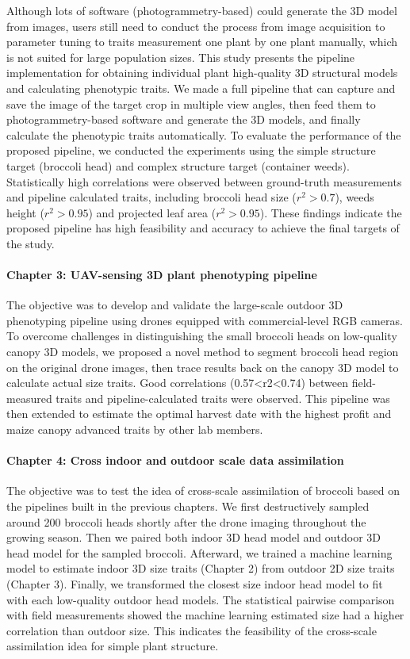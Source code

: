 \begin{eabstract}
  Although lots of software (photogrammetry-based) could generate the 3D model from images, users still need to conduct the process from image acquisition to parameter tuning to traits measurement one plant by one plant manually, which is not suited for large population sizes. This study presents the pipeline implementation for obtaining individual plant high-quality 3D structural models and calculating phenotypic traits. We made a full pipeline that can capture and save the image of the target crop in multiple view angles, then feed them to photogrammetry-based software and generate the 3D models, and finally calculate the phenotypic traits automatically. To evaluate the performance of the proposed pipeline, we conducted the experiments using the simple structure target (broccoli head) and complex structure target (container weeds). Statistically high correlations were observed between ground-truth measurements and pipeline calculated traits, including broccoli head size ($r^2>0.7$), weeds height ($r^2>0.95$) and projected leaf area ($r^2>0.95$). These findings indicate the proposed pipeline has high feasibility and accuracy to achieve the final targets of the study.

 \paragraph{Chapter 3: UAV-sensing 3D plant phenotyping pipeline}

  The objective was to develop and validate the large-scale outdoor 3D phenotyping pipeline using drones equipped with commercial-level RGB cameras. To overcome challenges in distinguishing the small broccoli heads on low-quality canopy 3D models, we proposed a novel method to segment broccoli head region on the original drone images, then trace results back on the canopy 3D model to calculate actual size traits. Good correlations (0.57<r2<0.74) between field-measured traits and pipeline-calculated traits were observed.
  This pipeline was then extended to estimate the optimal harvest date with the highest profit and maize canopy advanced traits by other lab members.
  

  \paragraph{Chapter 4: Cross indoor and outdoor scale data assimilation}

  The objective was to test the idea of cross-scale assimilation of broccoli based on the pipelines built in the previous chapters. We first destructively sampled around 200 broccoli heads shortly after the drone imaging throughout the growing season. Then we paired both indoor 3D head model and outdoor 3D head model for the sampled broccoli. Afterward, we trained a machine learning model to estimate indoor 3D size traits (Chapter 2) from outdoor 2D size traits (Chapter 3). Finally, we transformed the closest size indoor head model to fit with each low-quality outdoor head models. The statistical pairwise comparison with field measurements showed the machine learning estimated size had a higher correlation than outdoor size. This indicates the feasibility of the cross-scale assimilation idea for simple plant structure.


\end{eabstract}
